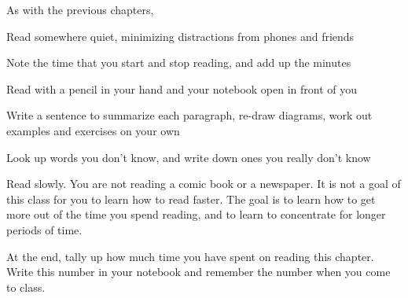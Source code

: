 \noindent As with the previous chapters,
\blist{0.0in}
\item Read somewhere quiet, minimizing distractions from phones and friends
\item Note the time that you start and stop reading, and add up the minutes
\item Read with a pencil in your hand and your notebook open in front of you
\item Write a sentence to summarize each paragraph, re-draw diagrams, work out examples and exercises on your own
\item Look up words you don't know, and write down ones you really don't know
\item Read slowly.  You are not reading a comic book or a newspaper.  It is not a goal of this class for you to learn how to read faster.  The goal is to learn how to get more out of the time you spend reading, and to learn to concentrate for longer periods of time.
\item At the end, tally up how much time you have spent on reading this chapter.
Write this number in your notebook and remember the number when you come to class.
\elist


\vfill          %
